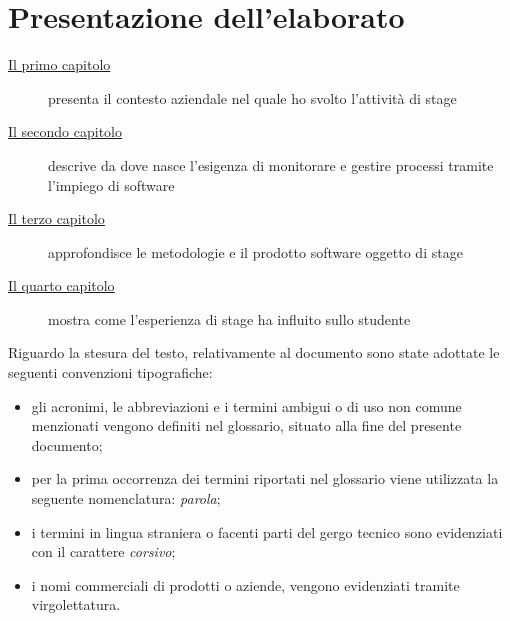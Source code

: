 
\cleardoublepage
{}
{}
\begingroup
\let\clearpage\relax
\let\cleardoublepage\relax
\let\cleardoublepage\relax

\chapter*{Presentazione dell'elaborato}
\begin{description}
    \item[{\hyperref[cap:introduzione]{Il primo capitolo}}] presenta il contesto aziendale nel quale ho svolto l'attività di stage
    \item[{\hyperref[cap:process-mining]{Il secondo capitolo}}] descrive da dove nasce l'esigenza di monitorare e gestire processi tramite l'impiego di software
    
    \item[{\hyperref[cap:modalita-svolgimento]{Il terzo capitolo}}] approfondisce le metodologie e il prodotto software oggetto di stage
    
    \item[{\hyperref[cap:performance-stage]{Il quarto capitolo}}] mostra come l'esperienza di stage ha influito sullo studente
    
\end{description}

Riguardo la stesura del testo, relativamente al documento sono state adottate le seguenti convenzioni tipografiche:
\begin{itemize}
	\item gli acronimi, le abbreviazioni e i termini ambigui o di uso non comune menzionati vengono definiti nel glossario, situato alla fine del presente documento;
	\item per la prima occorrenza dei termini riportati nel glossario viene utilizzata la seguente nomenclatura: \emph{parola}\glsfirstoccur;
	\item i termini in lingua straniera o facenti parti del gergo tecnico sono evidenziati con il carattere \emph{corsivo};
	\item i nomi commerciali di prodotti o aziende, vengono evidenziati tramite virgolettatura.
\end{itemize}


%
%

\endgroup			

\vfill

